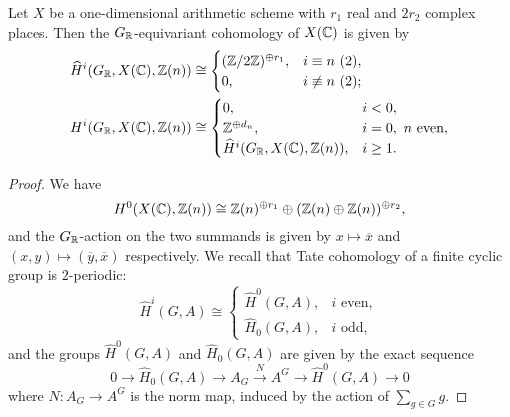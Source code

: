 \documentclass{article}
\numberwithin{equation}{section}
\begin{document}
\begin{proposition}
  Let $X$ be a one-dimensional arithmetic scheme with $r_1$ real and $2r_2$
  complex places. Then the $G_{\mathbb{R}}$-equivariant cohomology of $X (\mathbb{C})$ is given
  by
  \begin{align*}
    \widehat{H}^i (G_{\mathbb{R}}, X (\mathbb{C}), \mathbb{Z} (n)) & \cong
                                              \begin{cases}
                                                (\mathbb{Z}/2\mathbb{Z})^{\oplus r_1}, & i \equiv n ~ (2), \\
                                                0, & i \not\equiv n ~ (2);
                                              \end{cases} \\
    H^i (G_{\mathbb{R}}, X (\mathbb{C}), \mathbb{Z} (n)) & \cong
                                    \begin{cases}
                                      0, & i < 0, \\
                                      \mathbb{Z}^{\oplus d_n}, & i = 0, ~ n\text{ even}, \\
                                      \widehat{H}^i (G_{\mathbb{R}}, X (\mathbb{C}), \mathbb{Z} (n)), & i \ge 1.
                                    \end{cases}
  \end{align*}

  \begin{proof}
    We have
    \[ H^0 (X (\mathbb{C}), \mathbb{Z}(n)) \cong
      \mathbb{Z} (n)^{\oplus r_1} \oplus (\mathbb{Z} (n) \oplus \mathbb{Z} (n))^{\oplus r_2}, \]
    and the $G_{\mathbb{R}}$-action on the two summands is given by
    $x \mapsto \overline{x}$ and $(x,y) \mapsto (\overline{y}, \overline{x})$
    respectively. We recall that Tate cohomology of a finite cyclic group is
    $2$-periodic:
    \[ \widehat{H}^i (G,A) \cong
      \begin{cases}
        \widehat{H}^0 (G,A), & i\text{ even}, \\
        \widehat{H}_0 (G,A), & i\text{ odd},
      \end{cases} \]
    and the groups $\widehat{H}^0 (G,A)$ and $\widehat{H}_0 (G,A)$ are given by
    the exact sequence
    \[ 0 \to \widehat{H}_0 (G,A) \to
      A_G \xrightarrow{N} A^G \to
      \widehat{H}^0 (G,A) \to 0 \]
    where $N\colon A_G\to A^G$ is the norm map, induced by the action of
    $\sum_{g\in G} g$.

    \vspace{1em}


\end{proof}
\end{proposition}
\end{document}
